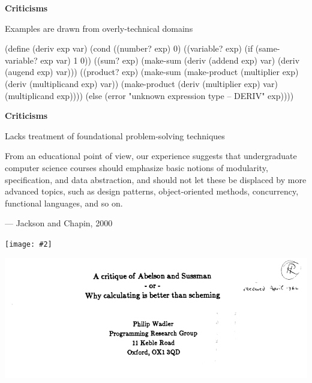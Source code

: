 \documentclass[UKenglish,usenames,dvipsnames,svgnames,table,aspectratio=169,mathserif]{beamer}
\newcommand{\nl}{\vspace{\baselineskip}}
\newcommand{\imageslide}[2][1]{{
\begin{frame}\begin{center}
\texttt{[image: \#2]}
\end{center}\end{frame}
}}
\begin{document}
\begin{frame}[fragile]

\begin{center}
{\bf Criticisms}
\end{center}
\begin{center}
Examples are drawn from overly-technical domains

\nl

{\scriptsize
\begin{schemecode}
(define (deriv exp var)
  (cond ((number? exp) 0)
        ((variable? exp)
         (if (same-variable? exp var) 1 0))
        ((sum? exp)
         (make-sum (deriv (addend exp) var)
                   (deriv (augend exp) var)))
        ((product? exp)
         (make-sum
           (make-product (multiplier exp)
                         (deriv (multiplicand exp) var))
           (make-product (deriv (multiplier exp) var)
                         (multiplicand exp))))
        (else
         (error "unknown expression type -- DERIV" exp))))
\end{schemecode}
}
\end{center}
\end{frame}


\begin{frame}

\begin{center}
{\bf Criticisms}
\end{center}
\begin{center}
Lacks treatment of foundational problem-solving techniques
\end{center}

\begin{block}{}
From an educational point of view, our experience suggests that undergraduate computer
science courses should emphasize basic notions of modularity, specification, and
data abstraction, and should not let these be displaced by more advanced topics,
such as design patterns, object-oriented methods, concurrency, functional languages,
and so on.

\nl

--- Jackson and Chapin, 2000
\end{block}
\end{frame}


\imageslide[0.5]{htdp-cover.png}

\begin{frame}
\centering
\includegraphics[scale=0.5]{wadler-title.png}
\end{frame}
\end{document}
